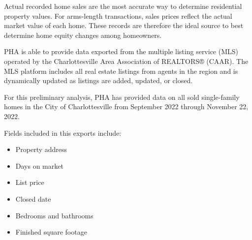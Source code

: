 \documentclass[
  letterpaper,
  DIV=11,
  numbers=noendperiod]{scrartcl}
\providecommand{\tightlist}{%
  \setlength{\itemsep}{0pt}\setlength{\parskip}{0pt}}\usepackage{longtable,booktabs,array}
\begin{document}
Actual recorded home sales are the most accurate way to determine
residential property values. For arms-length transactions, sales prices
reflect the actual market value of each home. These records are
therefore the ideal source to best determine home equity changes among
homeowners.

PHA is able to provide data exported from the multiple listing service
(MLS) operated by the Charlottesville Area Association of REALTORS®
(CAAR). The MLS platform includes all real estate listings from agents
in the region and is dynamically updated as listings are added, updated,
or closed.

For this preliminary analysis, PHA has provided data on all sold
single-family homes in the City of Charlottesville from September 2022
through November 22, 2022.

Fields included in this exports include:

\begin{itemize}
\tightlist
\item
  Property address
\item
  Days on market
\item
  List price
\item
  Closed date
\item
  Bedrooms and bathrooms
\item
  Finished square footage
\end{itemize}
\end{document}
